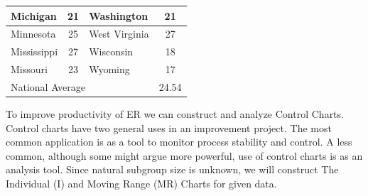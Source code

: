 \documentclass{article}
\begin{document}
\begin{table}[]
\begin{tabular}{|l|c|l|c|}
		Michigan      & 21                                                                & Washington     & 21                                                                \\ \hline
		Minnesota     & 25                                                                & West Virginia  & 27                                                                \\ \hline
		Mississippi   & 27                                                                & Wisconsin      & 18                                                                \\ \hline
		Missouri      & 23                                                                & Wyoming        & 17                                                                \\ \hline
		\multicolumn{3}{|l|}{National Average}                                                             & 24.54                                                             \\ \hline
	\end{tabular}
\end{table}
To improve productivity of ER we can construct and analyze Control Charts. 
Control charts have two general uses in an improvement project. The most common application is as a tool to monitor process stability and control. A less common, although some might argue more powerful, use of control charts is as an analysis tool.
Since natural subgroup size is unknown, we will construct The Individual (I) and Moving Range (MR) Charts for given data.
\pagebreak
\end{document}
